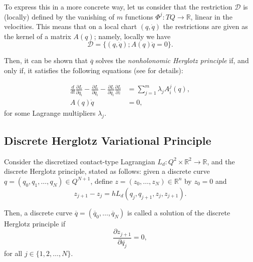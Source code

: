 \documentclass{aims}
\numberwithin{equation}{section}
\theoremstyle{definition}
\begin{document}
To express this in a more concrete way, let us consider that the restriction ${\mathcal D}$ is (locally) defined by the vanishing of $m$ functions $\Phi^j\colon TQ\to \mathbb{R}$, linear in the velocities. This means that on a local chart $(q, \dot{q})$ the restrictions are given as the kernel of a matrix $A(q)$; namely, locally we have
\[{\mathcal D} = \{(q, \dot{q}); A(q)\dot{q} = 0\}.\]

\noindent Then, it can be shown  that $\overline{q}$ solves the {\it nonholonomic Herglotz principle} if, and only if, it satisfies the following equations (see \cite{de2019contact} for details): 

\begin{equation}
    \begin{split}
      \frac{d}{dt}\frac{\partial L}{\partial\dot{q}_i}-\frac{\partial L}{\partial q_i} -\frac{\partial L}{\partial\dot{q}_i}\frac{\partial L}{\partial z}  &= \sum_{j=1}^m\lambda_j A_i^j(q),\\
      A(q)\dot{q} &= 0,
    \end{split}
\end{equation}
\noindent for some Lagrange multipliers $\lambda_j$.

 \subsection{Discrete Herglotz Variational Principle}
Consider the discretized contact-type Lagrangian $L_d\colon Q^2\times \mathbb{R}^2\to\mathbb{R}$, and the discrete Herglotz principle, stated as follows: given a discrete curve $q = (q_0, q_1, \ldots, q_N)\in Q^{N+1}$, define $z = (z_0, \ldots ,z_N)\in \mathbb{R}^n$ by $z_0 = 0$ and
  \begin{equation}\label{eq:discrete-action}
  z_{j+1} - z_j = h L_d(q_j, q_{j+1}, z_j, z_{j+1}).
  \end{equation}
  
  Then, a discrete curve $\overline{q} = (\overline{q}_0, \ldots, \overline{q}_N)$ is called a solution of the discrete Herglotz principle if \[\frac{\partial z_{j+1}}{\partial \overline{q_j}}= 0,\]
   for all $j\in \{1, 2, \ldots, N\}$.
\end{document}

